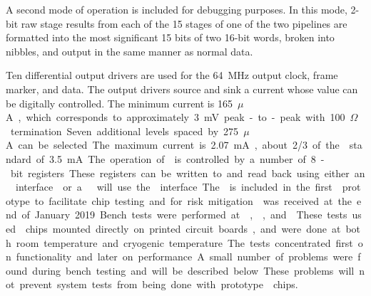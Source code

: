 A second
mode of operation is included for debugging purposes.  In this mode, \num{2}-bit raw
stage results from each of the \num{15} stages of one of the two pipelines are formatted
into the most significant \num{15} bits of two \num{16}-bit words, broken into nibbles, and
output in the same manner as normal data.

Ten differential output drivers are used for the \SI{64}{MHz} output clock, frame
marker, and  data. The output drivers source and sink a current whose
value can be digitally controlled. The minimum current is \SI{165}{$\mu$A},
which corresponds to approximately \SI{3}{mV} peak-to-peak with \SI{100}{$\Omega$}
termination. Seven additional levels spaced by \SI{275}{$\mu$A} can be selected.
The maximum current is \SI{2.07}{mA}, about \num{2/3} of the  standard of
\SI{3.5}{mA}.

The operation of  is controlled by a number of \num{8}-bit registers.
These registers can be written to and read back using either an 
interface~\cite{bib:I2C} or a .  will use the  interface. The
 is included in the first  prototype to facilitate chip testing
and for risk mitigation.

 was received at the end of January 2019.  Bench tests were performed at
, , and . These tests used  chips mounted directly
on printed circuit boards, and were done at both room temperature and cryogenic temperature.
The tests concentrated first on functionality and later on performance.
A small number of problems were found during bench testing and will be described below. These problems
will not prevent system tests from being done with prototype  chips.

